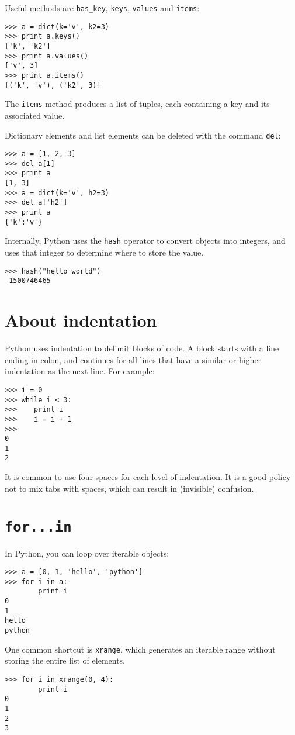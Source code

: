 \documentclass[justified,sixbynine,notoc]{tufte-book}
\def\ft{\small\tt}
\def\inxx#1{\index{#1}}
\begin{document}
\begin{fullwidth}
Useful methods are {\ft has\_key}, {\ft keys}, {\ft values} and {\ft items}:
\begin{lstlisting}
>>> a = dict(k='v', k2=3)
>>> print a.keys()
['k', 'k2']
>>> print a.values()
['v', 3]
>>> print a.items()
[('k', 'v'), ('k2', 3)]
\end{lstlisting}

The {\ft items} method produces a list of tuples, each containing a key and its associated value.

Dictionary elements and list elements can be deleted with the command {\ft del}:
\begin{lstlisting}
>>> a = [1, 2, 3]
>>> del a[1]
>>> print a
[1, 3]
>>> a = dict(k='v', h2=3)
>>> del a['h2']
>>> print a
{'k':'v'}
\end{lstlisting}

Internally, Python uses the {\ft hash} operator to convert objects into integers, and uses that integer to determine where to store the value.
\begin{lstlisting}
>>> hash("hello world")
-1500746465
\end{lstlisting}

\goodbreak\section{About indentation}

Python uses indentation to delimit blocks of code. A block starts with a line ending in colon, and continues for all lines that have a similar or higher indentation as the next line. For example:
\begin{lstlisting}
>>> i = 0
>>> while i < 3:
>>>    print i
>>>    i = i + 1
>>>
0
1
2
\end{lstlisting}

It is common to use four spaces for each level of indentation.
It is a good policy not to mix tabs with spaces, which can result in (invisible) confusion.

\goodbreak\section{{\ft for...in}}

\inxx{for}
In Python, you can loop over iterable objects:
\begin{lstlisting}
>>> a = [0, 1, 'hello', 'python']
>>> for i in a:
        print i
0
1
hello
python
\end{lstlisting}

One common shortcut is {\ft xrange},
which generates an iterable range without storing the entire list of elements.
\begin{lstlisting}
>>> for i in xrange(0, 4):
        print i
0
1
2
3
\end{lstlisting}


\end{fullwidth}
\end{document}
